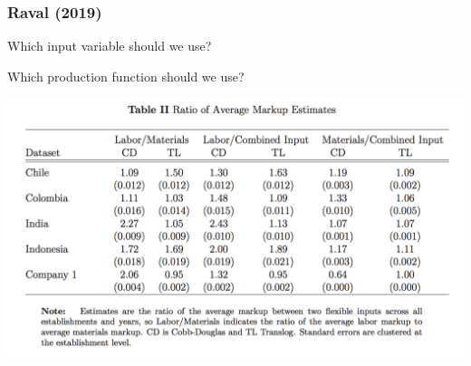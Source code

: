 \documentclass[11pt, aspectratio=169]{beamer}
\newenvironment{wideitemize}{\itemize\addtolength{\itemsep}{10pt}}{\enditemize}
\begin{document}
\begin{frame}[c]\frametitle{Raval (2019)}
    
\begin{wideitemize}
	\item Which input variable should we use?
	\item Which production function should we use?
\end{wideitemize}

\centering
\includegraphics[scale=.45]{RavalT2.png}

\end{frame}


\end{document}
